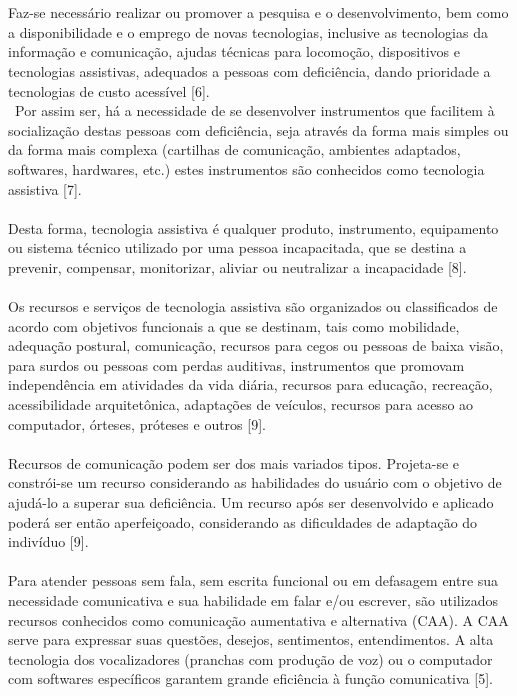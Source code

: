 \documentclass[twoside]{article}
\begin{document}
\begin{multicols}{2}
\\\\
Faz-se necessário realizar ou promover a pesquisa e o desenvolvimento, bem como a disponibilidade e o emprego de novas tecnologias, inclusive as tecnologias da informação e comunicação, ajudas técnicas para locomoção, dispositivos e tecnologias assistivas, adequados a pessoas com deficiência, dando prioridade a tecnologias de custo acessível [6].
\\\
Por assim ser, há a necessidade de se desenvolver instrumentos que facilitem à socialização destas pessoas com deficiência, seja através da forma mais simples ou da forma mais complexa (cartilhas de comunicação, ambientes adaptados, softwares, hardwares, etc.) estes instrumentos são conhecidos como tecnologia assistiva [7].
\\\\
Desta forma, tecnologia assistiva é qualquer produto, instrumento, equipamento ou sistema técnico utilizado por uma pessoa incapacitada, que se destina a prevenir, compensar, monitorizar, aliviar ou neutralizar a incapacidade [8].
\\\\
Os recursos e serviços de tecnologia assistiva são organizados ou classificados de acordo com objetivos funcionais a que se destinam, tais como mobilidade, adequação postural, comunicação, recursos para cegos ou pessoas de baixa visão, para surdos ou pessoas com perdas auditivas, instrumentos que promovam independência em atividades da vida diária, recursos para educação, recreação, acessibilidade arquitetônica, adaptações de veículos, recursos para acesso ao computador, órteses, próteses e outros [9].
\\\\
Recursos de comunicação podem ser dos mais variados tipos. Projeta-se e constrói-se um recurso considerando as habilidades do usuário com o objetivo de ajudá-lo a superar sua deficiência. Um recurso após ser desenvolvido e aplicado poderá ser então aperfeiçoado, considerando as dificuldades de adaptação do indivíduo [9]. 
\\\\
Para atender pessoas sem fala, sem escrita funcional ou em defasagem entre sua necessidade comunicativa e sua habilidade em falar e/ou escrever, são utilizados recursos conhecidos como comunicação aumentativa e alternativa (CAA). A CAA serve para expressar suas questões, desejos, sentimentos, entendimentos. A alta tecnologia dos vocalizadores (pranchas com produção de voz) ou o computador com softwares específicos garantem grande eficiência à função comunicativa [5].


\end{multicols}
\end{document}
